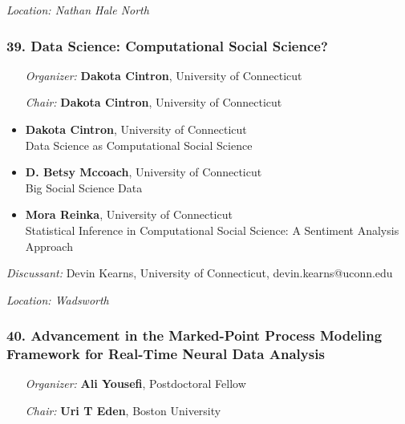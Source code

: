 \emph{Location: Nathan Hale North}

\subsubsection*{39. Data Science: Computational Social Science?}

\begin{enumerate}[align=left]
\item [\emph{Organizer:}] \textbf{Dakota Cintron}, University of Connecticut
\item [\emph{Chair:}] \textbf{Dakota Cintron}, University of Connecticut
\end{enumerate}

\begin{itemize}
\item \textbf{Dakota Cintron}, University of Connecticut \\
Data Science as Computational Social Science
\item \textbf{D. Betsy Mccoach}, University of Connecticut \\
Big Social Science Data
\item \textbf{Mora Reinka}, University of Connecticut \\
Statistical Inference in Computational Social Science: A Sentiment Analysis Approach
\end{itemize}

\emph{Discussant:} Devin Kearns, University of Connecticut, devin.kearns@uconn.edu

\emph{Location: Wadsworth}

\subsubsection*{40. Advancement in the Marked-Point Process Modeling Framework for Real-Time Neural Data Analysis}

\begin{enumerate}[align=left]
\item [\emph{Organizer:}] \textbf{Ali Yousefi}, Postdoctoral Fellow
\item [\emph{Chair:}] \textbf{Uri T Eden},  Boston University
\end{enumerate}

